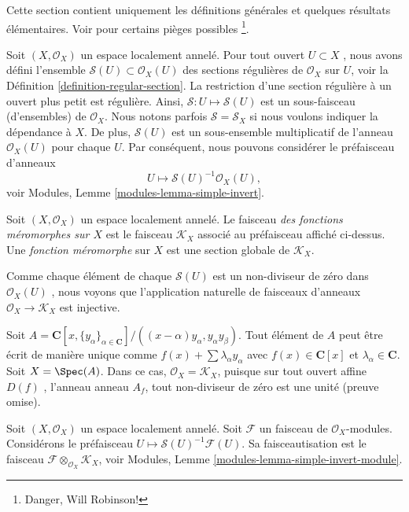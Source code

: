 \noindent
Cette section contient uniquement les définitions générales et quelques résultats
élémentaires. Voir  \cite{misconceptions}  pour certains pièges possibles \footnote
{Danger, Will Robinson! }.

\medskip\noindent
Soit  $(X, \mathcal{O}_X)$  un espace localement annelé. Pour tout ouvert  $U \subset X$ , nous
avons défini l'ensemble  $\mathcal{S}(U) \subset \mathcal{O}_X(U)$  des sections régulières de  $\mathcal{O}_X$  sur
 $U$, voir la Définition  \ref{definition-regular-section}. La restriction d'une section
régulière à un ouvert plus petit est régulière. Ainsi,  $\mathcal{S} : U \mapsto \mathcal{S}(U)$  est un
sous-faisceau (d'ensembles) de  $\mathcal{O}_X$. Nous notons parfois  $\mathcal{S} = \mathcal{S}_X$  si
nous voulons indiquer la dépendance à  $X$. De plus,  $\mathcal{S}(U)$  est un
sous-ensemble multiplicatif de l'anneau  $\mathcal{O}_X(U)$  pour chaque  $U$. Par
conséquent, nous pouvons considérer le préfaisceau d'anneaux
$$
U \longmapsto \mathcal{S}(U)^{-1} \mathcal{O}_X(U),
$$
voir Modules, Lemme  \ref{modules-lemma-simple-invert}.

\begin{definition}
\label{definition-sheaf-meromorphic-functions}
Soit  $(X, \mathcal{O}_X)$  un espace localement annelé. Le faisceau
 {\it  des fonctions méromorphes sur  $X$} 
est le faisceau  {\it   $\mathcal{K}_X$}  associé au
préfaisceau affiché ci-dessus. Une  {\it  fonction méromorphe
}  sur  $X$  est une section globale de  $\mathcal{K}_X$.
\end{definition}

\noindent
Comme chaque élément de chaque  $\mathcal{S}(U)$  est un non-diviseur de zéro dans
 $\mathcal{O}_X(U)$ , nous voyons que l'application naturelle de faisceaux d'anneaux
 $\mathcal{O}_X \to \mathcal{K}_X$  est injective.

\begin{example}
\label{example-no-change}
Soit  $A = \mathbf{C}[x, \{y_\alpha\}_{\alpha \in \mathbf{C}}]/
((x - \alpha)y_\alpha, y_\alpha y_\beta)$. Tout élément de  $A$  peut être écrit de manière unique
comme  $f(x) + \sum \lambda_\alpha y_\alpha$  avec  $f(x) \in \mathbf{C}[x]$  et  $\lambda_\alpha \in \mathbf{C}$. Soit  $X = \Spec(A)$. Dans ce
cas,  $\mathcal{O}_X = \mathcal{K}_X$, puisque sur tout ouvert affine  $D(f)$ , l'anneau
anneau  $A_f$, tout non-diviseur de zéro est une unité (preuve omise).
\end{example}

\noindent
Soit  $(X, \mathcal{O}_X)$  un espace localement annelé. Soit  $\mathcal{F}$  un faisceau de
 $\mathcal{O}_X$-modules. Considérons le préfaisceau  $U \mapsto \mathcal{S}(U)^{-1}\mathcal{F}(U)$. Sa faisceautisation
est le faisceau  $\mathcal{F} \otimes_{\mathcal{O}_X} \mathcal{K}_X$, voir Modules, Lemme  \ref{modules-lemma-simple-invert-module}.

